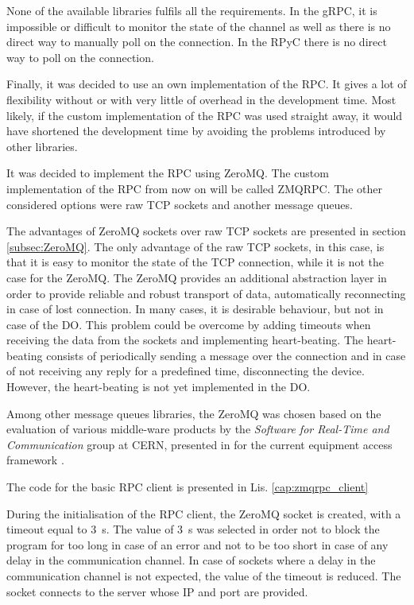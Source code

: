     None of the available libraries fulfils all the requirements. In the gRPC, it is impossible or difficult to monitor the state of the channel as well as there is no direct way to manually poll on the connection. In the RPyC there is no direct way to poll on the connection. 
    
    Finally, it was decided to use an own implementation of the RPC. It gives a lot of flexibility without or with very little of overhead in the development time. Most likely, if the custom implementation of the RPC was used straight away, it would have shortened the development time by avoiding the problems introduced by other libraries.
    
    It was decided to implement the RPC using ZeroMQ. The custom implementation of the RPC from now on will be called ZMQRPC. The other considered options were raw TCP sockets and another message queues. 
    
    The advantages of ZeroMQ sockets over raw TCP sockets are presented in section \ref{subsec:ZeroMQ}. The only advantage of the raw TCP sockets, in this case, is that it is easy to monitor the state of the TCP connection, while it is not the case for the ZeroMQ. The ZeroMQ provides an additional abstraction layer in order to provide reliable and robust transport of data, automatically reconnecting in case of lost connection. In many cases, it is desirable behaviour, but not in case of the DO. This problem could be overcome by adding timeouts when receiving the data from the sockets and implementing heart-beating. The heart-beating consists of periodically sending a message over the connection and in case of not receiving any reply for a predefined time, disconnecting the device. However, the heart-beating is not yet implemented in the DO.
    
    Among other message queues libraries, the ZeroMQ was chosen based on the evaluation of various middle-ware products by the \textit{Software for Real-Time and Communication} group at CERN, presented in \cite{zmq_comparison} for the current equipment access framework \cite{zmq_icaleps}.
    
    The code for the basic RPC client is presented in Lis. \ref{cap:zmqrpc_client}
    
    
    
    During the initialisation of the RPC client, the ZeroMQ socket is created, with a timeout equal to 3~s. The value of 3~s was selected in order not to block the program for too long in case of an error and not to be too short in case of any delay in the communication channel. In case of sockets where a delay in the communication channel is not expected, the value of the timeout is reduced. The socket connects to the server whose IP and port are provided. 
    
